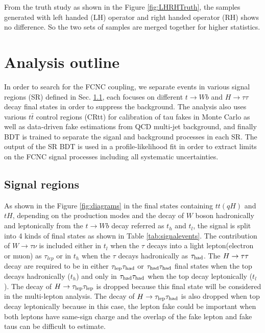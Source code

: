 

From the truth study as shown in the Figure \ref{fig:LHRHTruth}, the samples generated with left handed (LH) operator and right handed operator (RH) shows no difference. So the two sets of samples are merged together for higher statistics.



\section{Analysis outline}

In order to search for the FCNC coupling, we separate events in various signal regions (SR) defined in Sec. \ref{sec:SRs}, each focuses on
different $t\to Wb$ and $H\to\tau\tau$ decay final states in order to suppress the background.
The analysis also uses various $t\bar{t}$ control regions (CRtt) for calibration of tau fakes in Monte Carlo as well as
data-driven fake estimations from QCD multi-jet background, and finally BDT is trained to separate the
siganl and background processes in each SR. The output of
the SR BDT is used in a profile-likelihood fit in order to extract limits on the FCNC signal processes including all systematic uncertainties.

\subsection{Signal regions}
\label{sec:SRs}
As shown in the Figure \ref{fig:diagrams} in the final states containing $tt(qH)$ and $tH$, depending on the production modes and
the decay of $W$ boson hadronically and leptonically from the $t\to Wb$ decay referred as $t_h$ and $t_l$,
the signal is split into 4 kinds of final states as shown in Table \ref{tab:signalevents}. The contribution of $W\rightarrow\tau\nu$ is included either in 
$t_l$ when the $\tau$ decays into a light lepton(electron or muon) as $\tau_{lep}$ or in $t_h$ when the $\tau$ decays hadronically as $\tau_\text{had}$. 
 The $H \rightarrow \tau\tau$ decay are required to be in either $\tau_\text{lep}{}\tau_\text{had}$ or $\tau_\text{had}{}\tau_\text{had}$ final states when the top decays hadronically ($t_h$) and only in $\tau_\text{had}{}\tau_\text{had}$ when the top decay leptonically ($t_l$). The decay of $H\to\tau_\text{lep}{}\tau_\text{lep}$ is dropped because this final state will be considered in the multi-lepton analysis. The decay of $H\to\tau_\text{lep}{}\tau_\text{had}$ is also dropped when top decay leptonically because in this case, the lepton fake could be important when both leptons have same-sign charge
and the overlap of the fake lepton and fake taus can be difficult to estimate.

